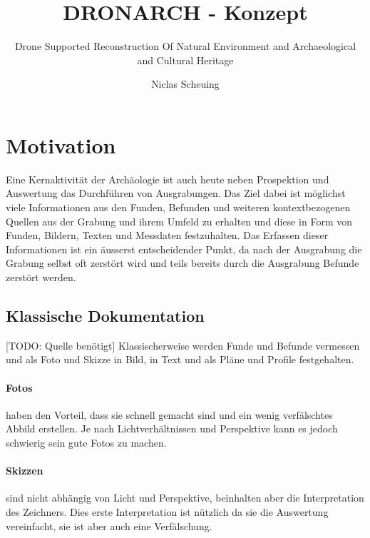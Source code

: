 \documentclass{paper}
\begin{document}
	
	\title{DRONARCH - Konzept}
	\subtitle{Drone Supported Reconstruction Of Natural Environment and Archaeological and Cultural Heritage}
	
	\author{Niclas Scheuing}
	 \setcounter{page}{1}
	\maketitle
	\tableofcontents
	 \setcounter{page}{1}
	
	\section{Motivation}
		Eine Kernaktivität der Archäologie ist auch heute neben Prospektion und Auswertung das Durchführen von Ausgrabungen.
		Das Ziel dabei ist möglichst viele Informationen aus den Funden, Befunden und weiteren kontextbezogenen Quellen aus der Grabung und ihrem Umfeld zu erhalten und diese in Form von Funden, Bildern, Texten und Messdaten festzuhalten.
		Das Erfassen dieser Informationen ist ein äusserst entscheidender Punkt, da nach der Ausgrabung die Grabung selbst oft zerstört wird und teils bereits durch die Ausgrabung Befunde zerstört werden.
		
		\subsection{Klassische Dokumentation}
			[TODO: Quelle benötigt]
			Klassischerweise werden Funde und Befunde vermessen und als Foto und Skizze in Bild, in Text und als Pläne und Profile festgehalten.

			\paragraph{Fotos} haben den Vorteil, dass sie schnell gemacht sind und ein wenig verfälschtes Abbild erstellen. Je nach Lichtverhältnissen und Perspektive kann es jedoch schwierig sein gute Fotos zu machen.
			
			\paragraph{Skizzen} sind nicht abhängig von Licht und Perspektive, beinhalten aber die Interpretation des Zeichners. Dies erste Interpretation ist nützlich da sie die Auswertung vereinfacht, sie ist aber auch eine Verfälschung.
			
\end{document}

